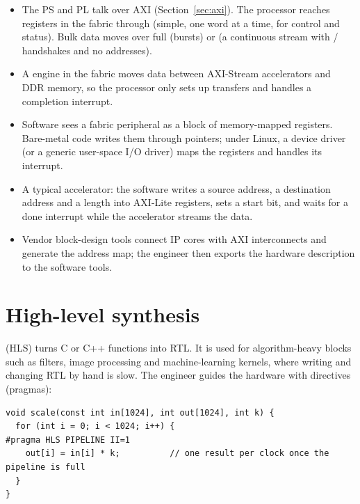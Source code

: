 \begin{itemize}
  \item The PS and PL talk over AXI (Section~\ref{sec:axi}). The processor reaches registers in the fabric through  (simple, one word at a time, for control and status). Bulk data moves over full  (bursts) or  (a continuous stream with / handshakes and no addresses).
  \item A  engine in the fabric moves data between AXI-Stream accelerators and DDR memory, so the processor only sets up transfers and handles a completion interrupt.
  \item Software sees a fabric peripheral as a block of memory-mapped registers. Bare-metal code writes them through  pointers; under Linux, a device driver (or a generic user-space I/O driver) maps the registers and handles its interrupt.
  \item A typical accelerator: the software writes a source address, a destination address and a length into AXI-Lite registers, sets a start bit, and waits for a done interrupt while the accelerator streams the data.
  \item Vendor block-design tools connect IP cores with AXI interconnects and generate the address map; the engineer then exports the hardware description to the software tools.
\end{itemize}

\section{High-level synthesis}

 (HLS) turns C or C++ functions into RTL. It is used for algorithm-heavy blocks such as filters, image processing and machine-learning kernels, where writing and changing RTL by hand is slow. The engineer guides the hardware with directives (pragmas):

\begin{lstlisting}
void scale(const int in[1024], int out[1024], int k) {
  for (int i = 0; i < 1024; i++) {
#pragma HLS PIPELINE II=1
    out[i] = in[i] * k;          // one result per clock once the pipeline is full
  }
}
\end{lstlisting}


